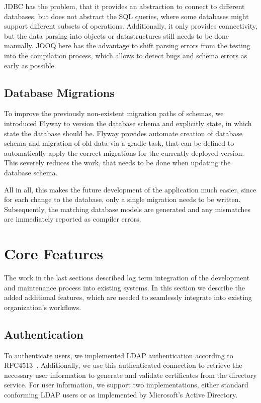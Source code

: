 JDBC has the problem, that it provides an abstraction to connect to different databases, but does not abstract the
SQL queries, where some databases might support different subsets of operations.
Additionally, it only provides connectivity, but the data parsing into objects or datastructures still needs to be done
manually.
JOOQ here has the advantage to shift parsing errors from the testing into the compilation process, which allows to
detect bugs and schema errors as early as possible.

\subsection*{Database Migrations}
To improve the previously non-existent migration paths of schemas, we introduced Flyway to version the database schema
and explicitly state, in which state the database should be.
Flyway provides automate creation of database schema and migration of old data via a gradle task, that can be defined to
automatically apply the correct migrations for the currently deployed version.
This severely reduces the work, that needs to be done when updating the database schema.

All in all, this makes the future development of the application much easier, since for each change to the database,
only a single migration needs to be written.
Subsequently, the matching database models are generated and any mismatches are immediately reported as compiler errors.

\section{Core Features}\label{sec:coreFeatures}

The work in the last sections described log term integration of the development and maintenance process into existing
systems.
In this section we describe the added additional features, which are needed to seamlessly integrate into existing
organization's workflows.

\subsection*{Authentication}
To authenticate users, we implemented LDAP authentication according to RFC4513~\cite{RFC4513}.
Additionally, we use this authenticated connection to retrieve the necessary user information to generate and validate
certificates from the directory service.
For user information, we support two implementations, either standard conforming LDAP users or as implemented by
Microsoft's Active Directory.

